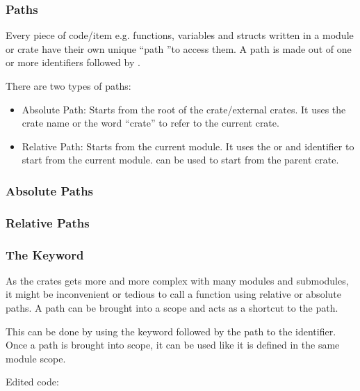 \documentclass{beamer}
\begin{document}
\begin{frame}
  \frametitle{Paths}
  Every piece of code/item e.g. functions, variables and structs written in a module or crate have their own unique ``path ''to access them.
  A path is made out of one or more identifiers followed by \inlinecode{::}.

  There are two types of paths:
  \begin{itemize}
    \item{Absolute Path: Starts from the root of the crate/external crates. It uses the crate name or the word ``crate'' to refer to the current crate.}
    \item{Relative Path: Starts from the current module. It uses the  or and identifier to start from the current module.  can be used to start from the parent crate.}
  \end{itemize}
\end{frame}

\begin{frame}
  \frametitle{Absolute Paths}
  
  
\end{frame}

\begin{frame}
  \frametitle{Relative Paths}
  
  
  
\end{frame}

\begin{frame}
  \frametitle{The  Keyword}
  As the crates gets more and more complex with many modules and submodules, it might be inconvenient or tedious to call a function using relative or absolute paths. A path can be brought into a scope and acts as a shortcut to the path.

  This can be done by using the  keyword followed by the path to the identifier. Once a path is brought into scope, it can be used like it is defined in the same module scope.
  

  Edited code:
  
\end{frame}
\end{document}
